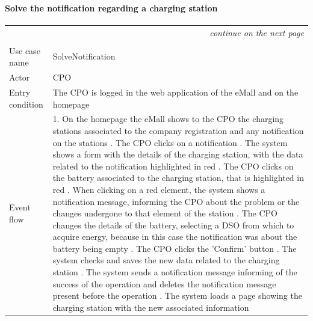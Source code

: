 \paragraph{Solve the notification regarding a charging station}
\begin{center}
    \begin{longtable}{p{4cm} p{11cm}}
    \multicolumn{2}{r}{\itshape{continue on the next page}}\\
    \endfoot 
    \\
    \endlastfoot
    \hline
     Use case name &  SolveNotification\\ %
     \hline
     Actor & CPO \\
     \hline
     Entry condition & The CPO is logged in the web application of the eMall and on the homepage \\
     \hline
     Event flow &   1. On the homepage the eMall shows to the CPO the charging stations associated to the company                   registration and any notification on the stations \newline
                    2. The CPO clicks on a notification \newline 
                    3. The system shows a form with the details of the charging station, with the data related to the notification highlighted in red  \newline
                    4. The CPO clicks on the battery associated to the charging station, that is highlighted in red \newline
                    5. When clicking on a red element, the system shows a notification message, informing the CPO about the problem or the changes undergone to that element of the station \newline
                    6. The CPO changes the details of the battery, selecting a DSO from which to acquire energy, because in this case the notification was about the battery being empty \newline
                    7. The CPO clicks the 'Confirm' button \newline
                    8. The system checks and saves the new data related to the charging station \newline
                    9. The system sends a notification message informing of the success of the operation and deletes the notification message present before the operation \newline
                    10. The system loads a page showing the charging station with the new associated information\\

\end{longtable}
\end{center}
